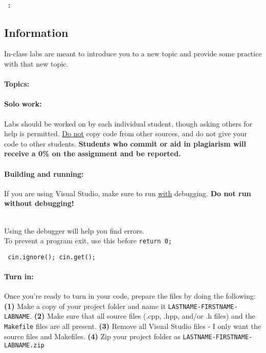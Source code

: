 ~\\ \textbf{\laType\ \laAssignment: \laTitle \tab }

\normalsize 

    \subsection*{Information}
    
        In-class labs are meant to introduce you to a new topic and provide
        some practice with that new topic. 
    
        \paragraph{Topics:} \laTopics
        
        \paragraph{Solo work:}
        Labs should be worked on by each
        individual student, though asking others for help is permitted.
        \underline{Do not} copy code from other sources, and do not give your
        code to other students.
        \textbf{ \color{red} Students who commit or aid in plagiarism will receive a 0\% on the assignment and be reported. }

        \paragraph{Building and running:} If you are using Visual Studio,
            make sure to run \underline{with} debugging.
            \textbf{ \color{red} Do not run without debugging! }

            ~\\
            Using the debugger will help you find errors. \\
            To prevent a program exit, use this before \texttt{return 0;}

            \begin{mdframed} \centering
                \texttt{ cin.ignore(); \tab cin.get(); }
            \end{mdframed}

        \paragraph{Turn in:}
            Once you're ready to turn in your code, prepare the files by
            doing the following: \textbf{(1)} Make a copy of your project folder and name it \texttt{LASTNAME-FIRSTNAME-LABNAME}.
            \textbf{(2)} Make sure that all source files (.cpp, .hpp, and/or .h files) and the \texttt{Makefile} files
            are all present.
            \textbf{(3)} Remove all Visual Studio files - I only want the source files and Makefiles.
            \textbf{(4)} Zip your project folder as \texttt{LASTNAME-FIRSTNAME-LABNAME.zip}
            
